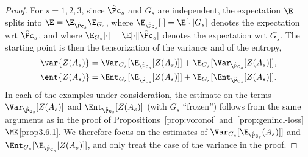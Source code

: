 \begin{proof}
For $s=1,2,3$, since $\hat\Pc_s$ and $G_s$ are independent, the expectation $\E$ splits into $\E=\E_{\hat\Pc_s}\E_{G_s}$, where $\E_{\hat\Pc_s}[\cdot]=\E[\cdot\|G_s]$ denotes the expectation wrt $\hat\Pc_s$, and where $\E_{G_s}[\cdot]=\E[\cdot\|\hat\Pc_s]$ denotes the expectation wrt $G_s$. The starting point is then the tensorization of the variance and of the entropy,
\begin{equation}\label{eq:var-tens-exact}
\begin{aligned}
\var{Z(A_s)}&=\Var_{G_s}[\E_{\hat\Pc_s}[Z(A_s)]]+\E_{G_s}[\Var_{\hat\Pc_s}[Z(A_s)]],\\
\ent{Z(A_s)}&=\Ent_{G_s}[\E_{\hat\Pc_s}[Z(A_s)]]+\E_{G_s}[\Ent_{\hat\Pc_s}[Z(A_s)]].
\end{aligned}
\end{equation}
In each of the examples under consideration, the estimate on the terms $\Var_{\hat\Pc_s}[Z(A_s)]$ and $\Ent_{\hat\Pc_s}[Z(A_s)]$ (with $G_s$ ``frozen'') follows from the same arguments as in the proof of Propositions~\ref{prop:voronoi} and~\ref{prop:genincl-loss}$\MK$\eqref{prop3.6.1}. We therefore focus on the estimates of $\Var_{G_s} [\E_{\hat\Pc_s}(A_s)]]$ and $\Ent_{G_s}[\E_{\hat\Pc_s}[Z(A_s)]]$, and only treat the case of the variance in the proof.


\end{proof}
